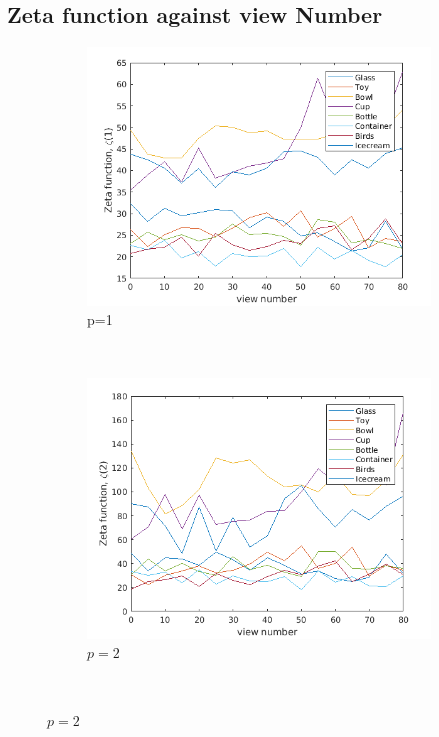 \documentclass[10pt,a4paper]{article}
\theoremstyle{plain}
\theoremstyle{definition}
\begin{document}
\subsection{Zeta function against view Number}
\begin{figure}[H]
	\centering
	\begin{subfigure}[b]{0.5\textwidth}
		\includegraphics[width= \textwidth]{images/zeta-viewnump1.png}
		\caption{p=1}
		\label{}
	\end{subfigure}~
	\begin{subfigure}[b]{0.5\textwidth}
		\includegraphics[width= \textwidth]{images/zeta-viewnump2.png}
		\caption{$p=2$}
		\label{}
	\end{subfigure}\\

\end{figure}
\end{document}
